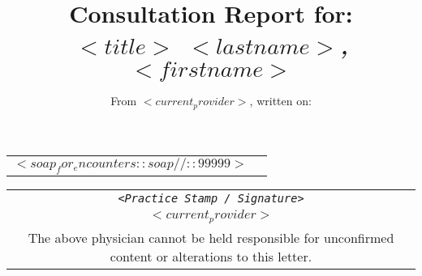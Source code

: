 \documentclass[10pt,english]{article}
\begin{document}

\title {Consultation Report for: \\ \emph {$<title>$ $<lastname>$, $<firstname>$}}
\author {From $<current_provider>$, written on:}
\maketitle 


\noindent
\begin{longtable}{l>{\raggedright}p{15cm}}
$<soap_for_encounters::soap//::99999>$
\end{longtable}


\begin{tabular}{c}
\rule{0pt}{10ex} \texttt {\textsl {\footnotesize <Practice Stamp / Signature>}}\\
\rule{0pt}{4ex} {\footnotesize $<current_provider>$}\\
\hline
\tiny The above physician cannot be held responsible for unconfirmed content or alterations to this letter. \\
\end{tabular}
\end{document}
